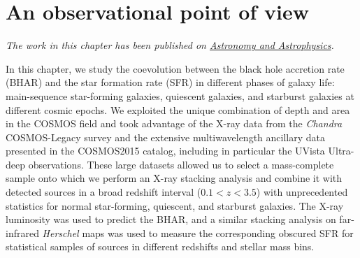 \chapter{An observational point of view} \label{ch:observations}

\begin{center}
  {\it The work in this chapter has been published on \href{https://www.aanda.org/articles/aa/pdf/2020/10/aa36649-19.pdf}{Astronomy and Astrophysics}.}
  \vspace{1cm}
\end{center}

In this chapter, we study the coevolution between the black hole accretion rate (BHAR) and the star formation rate (SFR) in different phases of galaxy life: main-sequence star-forming galaxies, quiescent galaxies, and starburst galaxies at different cosmic epochs.
   We exploited the unique combination of depth and area in the COSMOS field and took advantage of the X-ray data from the {\it Chandra} COSMOS-Legacy survey and the extensive multiwavelength ancillary data presented in the COSMOS2015 catalog, including in particular the UVista Ultra-deep observations.
   These large datasets allowed us to select a mass-complete sample onto which we perform an X-ray stacking analysis and combine it with detected sources in a broad redshift interval ($0.1<z<3.5$) with unprecedented statistics for normal star-forming, quiescent, and starburst galaxies. 
   The X-ray luminosity was used to predict the BHAR, and a similar stacking analysis on far-infrared {\it Herschel} maps was used to measure the corresponding obscured SFR for statistical samples of sources in different redshifts and stellar mass bins.
   
